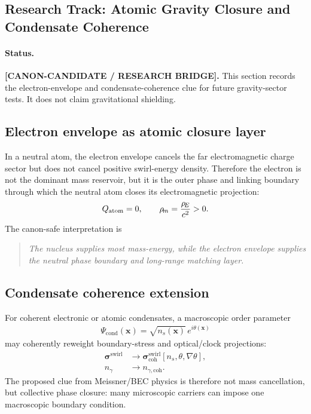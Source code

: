 \subsection{Research Track: Atomic Gravity Closure and Condensate Coherence}
\label{sec:rt_atomic_gravity_closure_condensate}

\paragraph{Status.}
\textbf{[CANON-CANDIDATE / RESEARCH BRIDGE].}
This section records the electron-envelope and condensate-coherence clue for
future gravity-sector tests. It does not claim gravitational shielding.

\subsection{Electron envelope as atomic closure layer}

In a neutral atom, the electron envelope cancels the far electromagnetic charge
sector but does not cancel positive swirl-energy density. Therefore the electron
is not the dominant mass reservoir, but it is the outer phase and linking
boundary through which the neutral atom closes its electromagnetic projection:
\begin{align}
    Q_{\mathrm{atom}}=0,
    \qquad
    \rho_{\!m}
    =
    \frac{\rho_{\!E}}{c^2}
    >0.
    \label{eq:rt_atomic_charge_mass_split}
\end{align}
The canon-safe interpretation is
\begin{quote}
\textit{
The nucleus supplies most mass-energy, while the electron envelope supplies
the neutral phase boundary and long-range matching layer.}
\end{quote}

\subsection{Condensate coherence extension}

For coherent electronic or atomic condensates, a macroscopic order parameter
\begin{align}
    \Psi_{\mathrm{cond}}(\mathbf{x})
    =
    \sqrt{n_s(\mathbf{x})}\,e^{i\theta(\mathbf{x})}
    \label{eq:rt_condensate_order_parameter}
\end{align}
may coherently reweight boundary-stress and optical/clock projections:
\begin{align}
    \boldsymbol{\sigma}^{\mathrm{swirl}}
    &\rightarrow
    \boldsymbol{\sigma}^{\mathrm{swirl}}_{\mathrm{coh}}[n_s,\theta,\nabla\theta],
    \\
    n_\gamma
    &\rightarrow
    n_{\gamma,\mathrm{coh}}.
    \label{eq:rt_condensate_projection_reweighting}
\end{align}
The proposed clue from Meissner/BEC physics is therefore not mass cancellation,
but collective phase closure: many microscopic carriers can impose one
macroscopic boundary condition.

